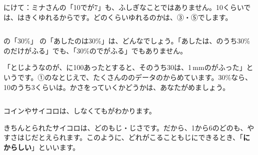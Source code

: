\bkhatenaref にけて：ミナさんの「10でが7」も、ふしぎなことではありません。10くらいでは、はきくゆれるからです。どのくらいゆれるのかは、③・⑤でします。

\begin{column}{の「30\%」}
の「あしたのは30\%」は、どんなでしょう。「あしたは、のうち30\%のだけがふる」でも、「30\%のでがふる」でもありません。\par
「とじようなのが、に100あったとすると、そのうち30は、1\,mmのがふった」というです。①のなとじえで、たくさんののデータのからめています。30\%なら、10のうち3くらいは。かさをっていくかどうかは、あなたがめましょう。
\end{column}


\leavevmode\label{bk:3-17:kazoeru}コインやサイコロは、しなくてもがわかります。

\noindent\begin{minipage}[c]{0.66\linewidth}
きちんとられたサイコロは、どのもじ・じさです。だから、1から6のどのも、やすさはじだとえられます。このように、どれがこることもじにできるとき、「\textbf{にからしい}」といいます。
\end{minipage}\hfill
\begin{minipage}[c]{0.3\linewidth}\centering
{}
\end{minipage}

